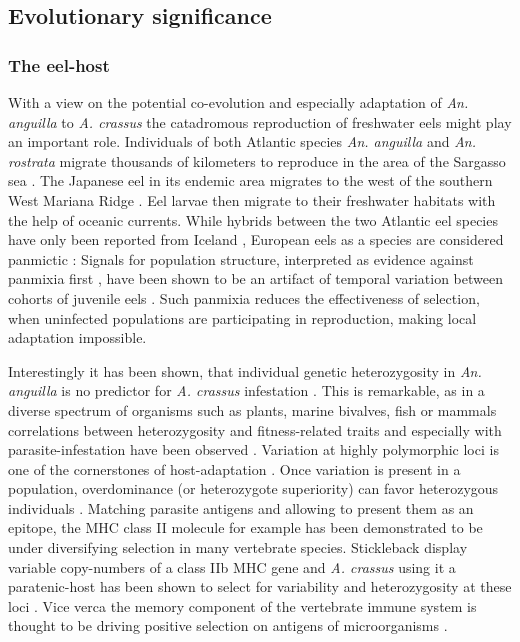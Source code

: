 \subsection{Evolutionary significance}
\label{ev-sig}

\subsubsection{The eel-host}
\label{sec:eel-host}

With a view on the potential co-evolution and especially adaptation of
\textit{An. anguilla} to \textit{A. crassus} the catadromous
reproduction of freshwater eels might play an important
role. Individuals of both Atlantic species \textit{An. anguilla} and
\textit{An. rostrata} migrate thousands of kilometers to reproduce in
the area of the Sargasso sea \cite{pmid19779192}. The Japanese eel in
its endemic area migrates to the west of the southern West Mariana
Ridge \cite{pmid20735676}. Eel larvae then migrate to their freshwater
habitats with the help of oceanic currents. While hybrids between the
two Atlantic eel species have only been reported from Iceland
\cite{pmid21299662}, European eels as a species are considered
panmictic \cite{pmid20735687}: Signals for population structure,
interpreted as evidence against panmixia first \cite{pmid11234011},
have been shown to be an artifact of temporal variation between
cohorts of juvenile eels \cite{pmid19417764, pmid21299662,
  pmid16024374}. Such panmixia reduces the effectiveness of selection,
when uninfected populations are participating in reproduction, making
local adaptation impossible.

Interestingly it has been shown, that individual genetic heterozygosity
in \textit{An. anguilla} is no predictor for \textit{A. crassus}
infestation \cite{pmid19840264}. This is remarkable, as in a diverse
spectrum of organisms such as plants, marine bivalves, fish or mammals
correlations between heterozygosity and fitness-related traits and
especially with parasite-infestation have been observed
\cite{pmid16262866,pmid18398424}. Variation at highly polymorphic loci
is one of the cornerstones of host-adaptation
\cite{pmid20078764}. Once variation is present in a population,
overdominance (or heterozygote superiority) can favor heterozygous
individuals \cite{pmid19129114,pmid17603099}. Matching parasite
antigens and allowing to present them as an epitope, the MHC class II
molecule for example has been demonstrated to be under diversifying
selection in many vertebrate species. Stickleback display variable
copy-numbers of a class IIb MHC gene and \textit{A. crassus} using it
a paratenic-host has been shown to select for variability and
heterozygosity at these loci \cite{wegner_parasite_2003}. Vice verca
the memory component of the vertebrate immune system is thought to be
driving positive selection on antigens of microorganisms
\cite{conway_measuring_2002}.

